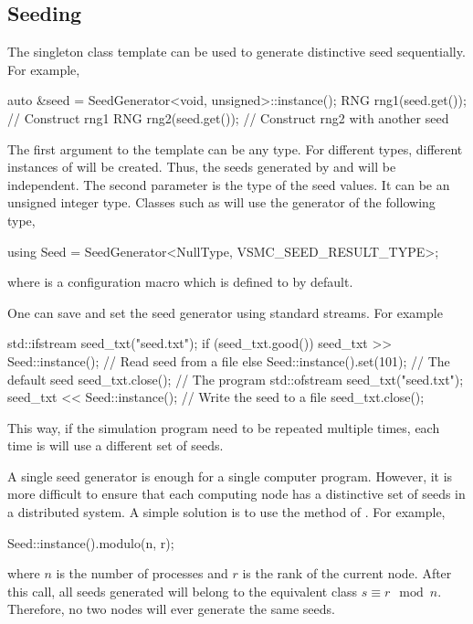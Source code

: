 \documentclass[11pt,bib,mint,hyper,altcolor]{marticle}
\begin{document}
\subsection{Seeding}
\label{sub:Seeding}

The singleton class template  can be used to generate
distinctive seed sequentially. For example,
\begin{cppcode}
  auto &seed = SeedGenerator<void, unsigned>::instance();
  RNG rng1(seed.get()); // Construct rng1
  RNG rng2(seed.get()); // Construct rng2 with another seed
\end{cppcode}
The first argument to the template can be any type. For different types,
different instances of  will be created. Thus, the
seeds generated by  and
 will be independent. The second parameter is the
type of the seed values. It can be an unsigned integer type. Classes such as
 will use the generator of the following type,
\begin{cppcode}
  using Seed = SeedGenerator<NullType, VSMC_SEED_RESULT_TYPE>;
\end{cppcode}
where  is a configuration macro which is
defined to  by default.

One can save and set the seed generator using standard \cpp streams. For
example
\begin{cppcode}
  std::ifstream seed_txt("seed.txt");
  if (seed_txt.good())
      seed_txt >> Seed::instance(); // Read seed from a file
  else
      Seed::instance().set(101);    // The default seed
  seed_txt.close();
  // The program
  std::ofstream seed_txt("seed.txt");
  seed_txt << Seed::instance();     // Write the seed to a file
  seed_txt.close();
\end{cppcode}
This way, if the simulation program need to be repeated multiple times, each
time is will use a different set of seeds.

A single seed generator is enough for a single computer program. However, it is
more difficult to ensure that each computing node has a distinctive set of
seeds in a distributed system. A simple solution is to use the
 method of . For example,
\begin{cppcode}
  Seed::instance().modulo(n, r);
\end{cppcode}
where $n$ is the number of processes and $r$ is the rank of the current node.
After this call, all seeds generated will belong to the equivalent class
$s \equiv r\mod{n}$. Therefore, no two nodes will ever generate the
same seeds.
\end{document}
